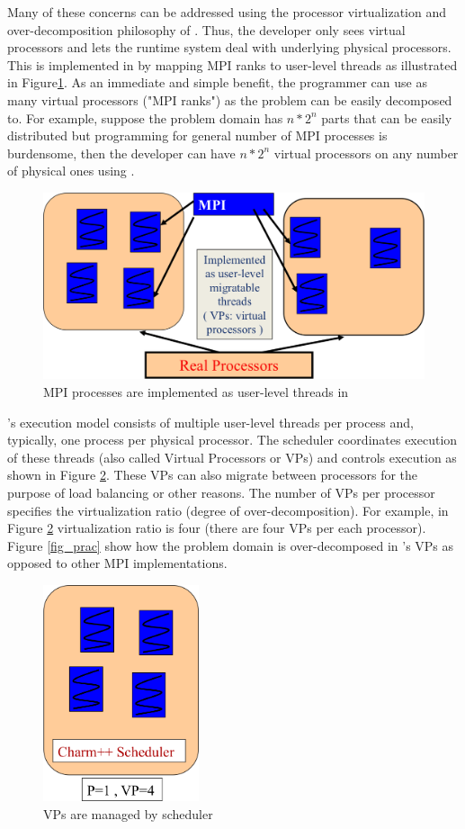 \documentclass[10pt]{article}
\begin{document}
Many of these concerns can be addressed using the processor virtualization and 
over-decomposition philosophy of \charmpp{}. Thus, the developer only sees 
virtual processors and lets the runtime system deal with underlying physical 
processors. This is implemented in \ampi{} by mapping MPI ranks to \charmpp{}
user-level threads as illustrated in Figure\ref{fig_virt}. As an immediate and
simple benefit, the programmer can use as many virtual processors ("MPI ranks")
as the problem can be easily decomposed to. For example, suppose the problem
domain has $n*2^n$ parts that can be easily distributed but programming for
general number of MPI processes is burdensome, then the developer can have
$n*2^n$ virtual processors on any number of physical ones using \ampi{}.
  
\begin{figure}[h]
\centering
\includegraphics[width=4.6in]{figs/virtualization.png}
\caption{MPI processes are implemented as user-level threads in \ampi{}}
\label{fig_virt}
\end{figure}

\ampi{}'s execution model consists of multiple user-level threads per process and,
typically, one process per physical processor. The \charmpp{} scheduler coordinates
execution of these threads (also called Virtual Processors or VPs) and controls
execution as shown in Figure \ref{fig_ratio}. These VPs can also migrate between
processors for the purpose of load balancing or other reasons. The number of VPs
per processor specifies the virtualization ratio (degree of over-decomposition).
For example, in Figure \ref{fig_ratio} virtualization ratio is four (there are
four VPs per each processor). Figure \ref{fig_prac} show how the problem domain
is over-decomposed in \ampi{}'s VPs as opposed to other MPI implementations.

\begin{figure}[h]
\centering
\includegraphics[width=1.8in]{figs/ratio.png}
\caption{VPs are managed by \charmpp{} scheduler}
\label{fig_ratio}
\end{figure}
\end{document}
